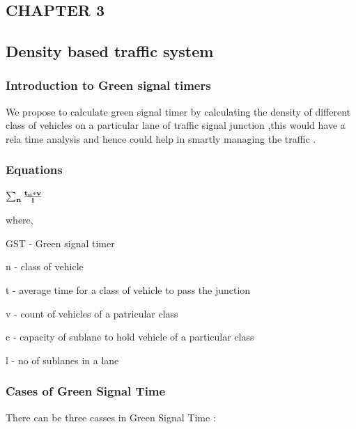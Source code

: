 \documentclass[12pt,a4paper]{report}
\begin{document}
	


\begin{center}
	\chapter{\textbf{\Large{CHAPTER 3}}}
\end{center}
  
\section {\textbf{\large Density based traffic system}}
\subsection{ Introduction to Green signal timers}

We propose to calculate green signal timer by calculating the density of different class of vehicles on a particular lane of traffic signal junction ,this would have a rela time analysis and hence could help in smartly managing the traffic .

\subsection{Equations }
\begin{center}
\begin{math}
\bf\sum_n \frac{\huge t_n * \huge v}{\huge l}
\end{math}
\end{center}
where,\par
GST - Green signal timer\par
 n - class of vehicle \par 
t - average time for a class of vehicle to pass the junction\par
 v - count of vehicles of a patricular class\par
 c - capacity of sublane to hold vehicle of a particular class\par
 l - no of sublanes in a lane\par

\newpage
\subsection{Cases of Green Signal Time }
There can be three casses in Green Signal Time :\\ \par 
\end{document}
